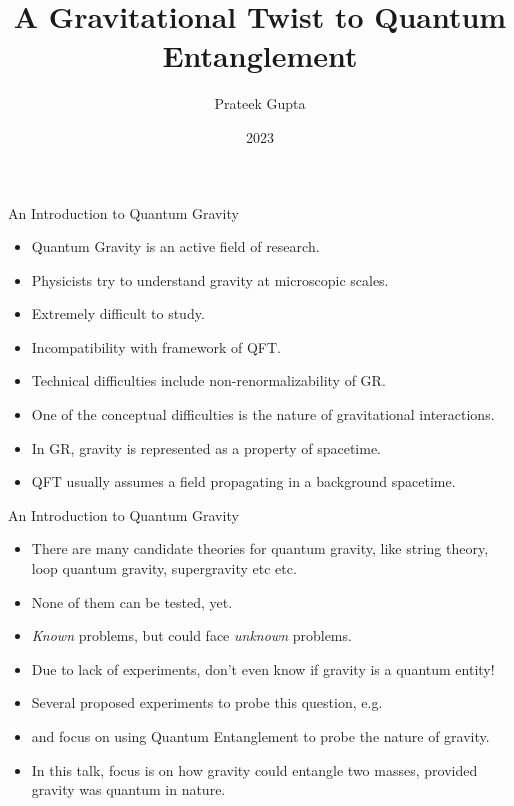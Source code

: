 \documentclass[12pt,aspectratio=1610]{beamer}
\title{A Gravitational Twist to Quantum Entanglement}
\author{Prateek Gupta}
\institute{The University of Edinburgh}
\date{2023}
\begin{document}
\frame{\titlepage}
\begin{frame}{An Introduction to Quantum Gravity}
    \begin{itemize}
        \item <1-> Quantum Gravity is an active field of research.
        \item <2-> Physicists try to understand gravity at microscopic scales.
        \item <3-> Extremely difficult to study.
        \item <4-> Incompatibility with framework of QFT.
        \item <5-> Technical difficulties include non-renormalizability of GR.
        \item <6-> One of the conceptual difficulties is the nature of gravitational interactions.
        \item <7-> In GR, gravity is represented as a property of spacetime.
        \item <8-> QFT usually assumes a field propagating in a background spacetime.
    \end{itemize}
\end{frame}
\begin{frame}{An Introduction to Quantum Gravity}
    \begin{itemize}
        \item <1-> There are many candidate theories for quantum gravity, like string theory, loop quantum gravity, supergravity etc etc.
        \item <2-> None of them can be tested, yet.
        \item <3-> \textit{Known} problems, but could face \textit{unknown} problems.
        \item <4-> Due to lack of experiments, don't even know if gravity is a quantum entity!
        \item <5-> Several proposed experiments to probe this question, e.g. \citet{PhysRevD.98.126009, doi:10.1142/S0218271819430016, Bose_2017, Marletto_2017}
        \item <6-> \citet{Bose_2017} and \citet{Marletto_2017} focus on using Quantum Entanglement to probe the nature of gravity.
        \item <7-> In this talk, focus is on how gravity could entangle two masses, provided gravity was quantum in nature.
    \end{itemize}
\end{frame}
\end{document}
